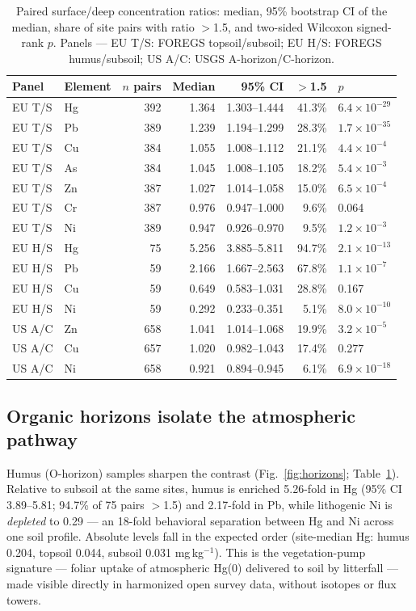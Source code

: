 \documentclass[11pt]{article}
\begin{document}
\begin{table}[t]
\centering\small
\caption{Paired surface/deep concentration ratios: median, 95\% bootstrap CI
of the median, share of site pairs with ratio $>$1.5, and two-sided Wilcoxon
signed-rank $p$. Panels --- EU T/S: FOREGS topsoil/subsoil; EU H/S: FOREGS
humus/subsoil; US A/C: USGS A-horizon/C-horizon.}
\label{tab:ratios}
\begin{tabular}{llrrrrl}
\toprule
Panel & Element & $n$ pairs & Median & 95\% CI & $>$1.5 & $p$ \\
\midrule
EU T/S & Hg & 392 & 1.364 & 1.303--1.444 & 41.3\% & $6.4{\times}10^{-29}$ \\
EU T/S & Pb & 389 & 1.239 & 1.194--1.299 & 28.3\% & $1.7{\times}10^{-35}$ \\
EU T/S & Cu & 384 & 1.055 & 1.008--1.112 & 21.1\% & $4.4{\times}10^{-4}$ \\
EU T/S & As & 384 & 1.045 & 1.008--1.105 & 18.2\% & $5.4{\times}10^{-3}$ \\
EU T/S & Zn & 387 & 1.027 & 1.014--1.058 & 15.0\% & $6.5{\times}10^{-4}$ \\
EU T/S & Cr & 387 & 0.976 & 0.947--1.000 & 9.6\% & 0.064 \\
EU T/S & Ni & 389 & 0.947 & 0.926--0.970 & 9.5\% & $1.2{\times}10^{-3}$ \\
\midrule
EU H/S & Hg & 75 & 5.256 & 3.885--5.811 & 94.7\% & $2.1{\times}10^{-13}$ \\
EU H/S & Pb & 59 & 2.166 & 1.667--2.563 & 67.8\% & $1.1{\times}10^{-7}$ \\
EU H/S & Cu & 59 & 0.649 & 0.583--1.031 & 28.8\% & 0.167 \\
EU H/S & Ni & 59 & 0.292 & 0.233--0.351 & 5.1\% & $8.0{\times}10^{-10}$ \\
\midrule
US A/C & Zn & 658 & 1.041 & 1.014--1.068 & 19.9\% & $3.2{\times}10^{-5}$ \\
US A/C & Cu & 657 & 1.020 & 0.982--1.043 & 17.4\% & 0.277 \\
US A/C & Ni & 658 & 0.921 & 0.894--0.945 & 6.1\% & $6.9{\times}10^{-18}$ \\
\bottomrule
\end{tabular}
\end{table}

\subsection{Organic horizons isolate the atmospheric pathway}
Humus (O-horizon) samples sharpen the contrast (Fig.~\ref{fig:horizons};
Table~\ref{tab:ratios}). Relative to subsoil at the same sites, humus is
enriched 5.26-fold in Hg (95\% CI 3.89--5.81; 94.7\% of 75 pairs $>$1.5) and
2.17-fold in Pb, while lithogenic Ni is \emph{depleted} to 0.29 --- an
18-fold behavioral separation between Hg and Ni across one soil profile.
Absolute levels fall in the expected order (site-median Hg: humus 0.204,
topsoil 0.044, subsoil 0.031 mg\,kg$^{-1}$). This is the vegetation-pump
signature --- foliar uptake of atmospheric Hg(0) delivered to soil by
litterfall \cite{jiskra2018,obrist2017} --- made visible directly in
harmonized open survey data, without isotopes or flux towers.
\end{document}
